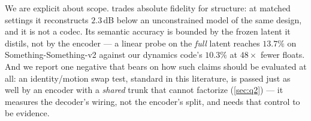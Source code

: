 We are explicit about scope. \method{} trades absolute fidelity for structure: at
matched settings it reconstructs $2.3$\,dB below an unconstrained model of the same
design, and it is not a codec. Its semantic accuracy is bounded by the frozen latent it
distils, not by the encoder --- a linear probe on the \emph{full} latent reaches
$13.7\%$ on Something-Something-v2 against our dynamics code's $10.3\%$ at $48\times$
fewer floats. And we report one negative that bears on how such claims should be
evaluated at all: an identity/motion swap test, standard in this literature, is passed
just as well by an encoder with a \emph{shared} trunk that cannot factorize
(\cref{sec:q2}) --- it measures the decoder's wiring, not the encoder's split, and needs
that control to be evidence.

